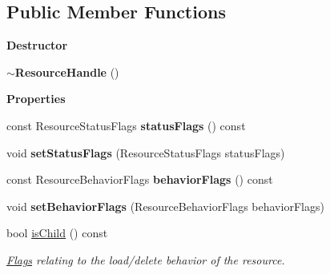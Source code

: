 \subsection*{Public Member Functions}
\begin{Indent}\textbf{ Destructor}\par
\begin{DoxyCompactItemize}
\item 
\mbox{\label{classrev_1_1_resource_handle_a4dd73345ba09211fa9f42816a2aa530e}} 
{\bfseries $\sim$\+Resource\+Handle} ()
\end{DoxyCompactItemize}
\end{Indent}
\begin{Indent}\textbf{ Properties}\par
\begin{DoxyCompactItemize}
\item 
\mbox{\label{classrev_1_1_resource_handle_acff6d6eb4382de2dfc4d4b5889e1ea60}} 
const Resource\+Status\+Flags {\bfseries status\+Flags} () const
\item 
\mbox{\label{classrev_1_1_resource_handle_a3116c37626d603f2e6041a5a8b8c65ca}} 
void {\bfseries set\+Status\+Flags} (Resource\+Status\+Flags status\+Flags)
\item 
\mbox{\label{classrev_1_1_resource_handle_a8f21e9272fc981533f5fe36896a02d43}} 
const Resource\+Behavior\+Flags {\bfseries behavior\+Flags} () const
\item 
\mbox{\label{classrev_1_1_resource_handle_ac811b720729fd345b63323246de83704}} 
void {\bfseries set\+Behavior\+Flags} (Resource\+Behavior\+Flags behavior\+Flags)
\item 
\mbox{\label{classrev_1_1_resource_handle_a842afcae330ba31cb2ca909fa09deaba}} 
bool \mbox{\hyperlink{classrev_1_1_resource_handle_a842afcae330ba31cb2ca909fa09deaba}{is\+Child}} () const
\begin{DoxyCompactList}\small\item\em \mbox{\hyperlink{classrev_1_1_flags}{Flags}} relating to the load/delete behavior of the resource. \end{DoxyCompactList}\item 

\end{DoxyCompactItemize}
\end{Indent}
